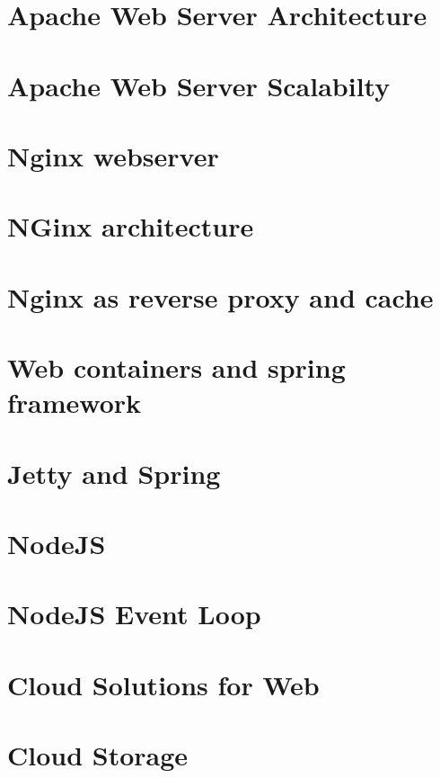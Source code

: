 \documentclass[11pt]{article}
\begin{document}
\section{Apache Web Server Architecture}
    
\section{Apache Web Server Scalabilty}
    
\section{Nginx webserver}
    
\section{NGinx architecture}
    
\section{Nginx as reverse proxy and cache}
    
\section{Web containers and spring framework}
    
\section{Jetty and Spring}
    
\section{NodeJS}    

\section{NodeJS Event Loop}
    
\section{Cloud Solutions for Web}
    
\section{Cloud Storage}
\end{document}

